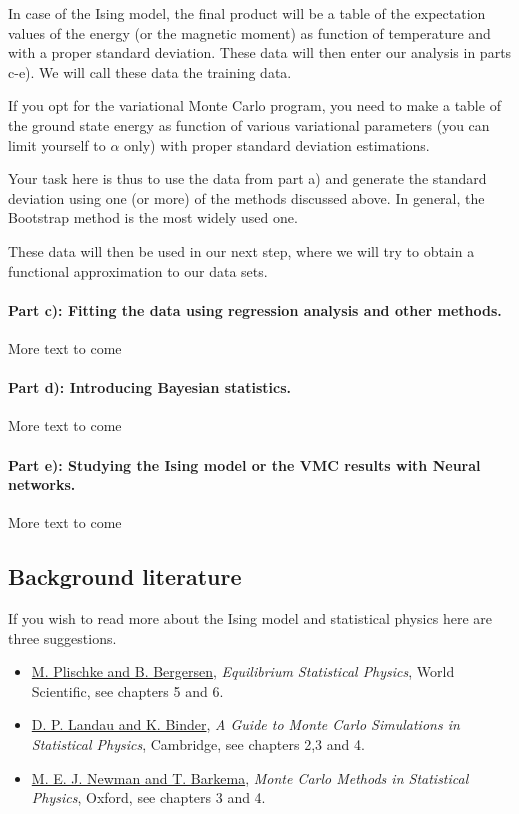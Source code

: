 \documentclass[%
oneside,                 %
final,                   %
10pt]{article}
\begin{document}
In case of the Ising model, the final product will be a table of the expectation values of the energy (or the magnetic moment) as function of temperature and with a proper standard deviation. These data will then enter our analysis in parts c-e). We will call these data the training data. 

If you opt for the variational Monte Carlo program, you need to make a table of the ground state energy as function of various variational parameters (you can limit yourself to $\alpha$ only) with proper standard deviation estimations.

Your task here is thus to use the data from part a) and generate the standard deviation using one (or more) of the methods discussed above. In general, the Bootstrap method is the most widely used one. 

These data will then be used in our next step, where we will try to obtain a functional approximation to our data sets. 

\paragraph{Part c): Fitting the data using regression analysis and other methods.}
More text to come
\paragraph{Part d): Introducing Bayesian statistics.}
More text to come

\paragraph{Part e): Studying the Ising model or the VMC results with Neural networks.}
More text to come

\subsection*{Background literature}

If you wish to read more about the Ising model and statistical physics here are three suggestions.

\begin{itemize}
  \item \href{{http://www.worldscientific.com/worldscibooks/10.1142/5660}}{M. Plischke and B. Bergersen}, \emph{Equilibrium Statistical Physics}, World Scientific, see chapters 5 and 6.

  \item \href{{http://www.cambridge.org/no/academic/subjects/physics/computational-science-and-modelling/guide-monte-carlo-simulations-statistical-physics-4th-edition?format=HB}}{D. P. Landau and K. Binder}, \emph{A Guide to Monte Carlo Simulations in Statistical Physics}, Cambridge, see chapters 2,3 and 4.

  \item \href{{https://global.oup.com/academic/product/monte-carlo-methods-in-statistical-physics-9780198517979?cc=no&lang=en&}}{M. E. J. Newman and T. Barkema}, \emph{Monte Carlo Methods in Statistical Physics}, Oxford, see chapters 3 and 4.
\end{itemize}
\end{document}
